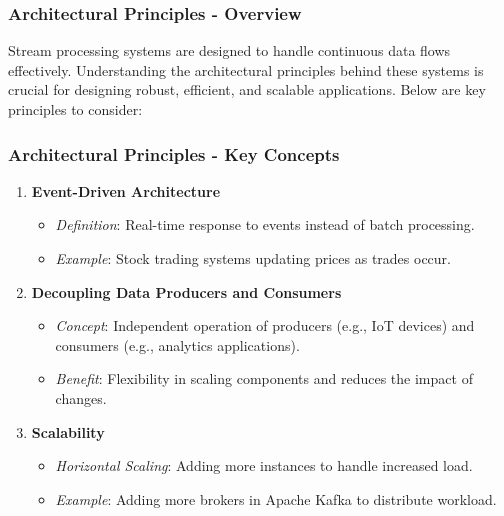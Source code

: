\documentclass[aspectratio=169]{beamer}
\begin{document}
\begin{frame}[fragile]
    \frametitle{Architectural Principles - Overview}
    Stream processing systems are designed to handle continuous data flows effectively. Understanding the architectural principles behind these systems is crucial for designing robust, efficient, and scalable applications. Below are key principles to consider:
\end{frame}

\begin{frame}[fragile]
    \frametitle{Architectural Principles - Key Concepts}
    \begin{enumerate}
        \item \textbf{Event-Driven Architecture}
        \begin{itemize}
            \item \textit{Definition}: Real-time response to events instead of batch processing.
            \item \textit{Example}: Stock trading systems updating prices as trades occur.
        \end{itemize}
        
        \item \textbf{Decoupling Data Producers and Consumers}
        \begin{itemize}
            \item \textit{Concept}: Independent operation of producers (e.g., IoT devices) and consumers (e.g., analytics applications).
            \item \textit{Benefit}: Flexibility in scaling components and reduces the impact of changes.
        \end{itemize}
        
        \item \textbf{Scalability}
        \begin{itemize}
            \item \textit{Horizontal Scaling}: Adding more instances to handle increased load.
            \item \textit{Example}: Adding more brokers in Apache Kafka to distribute workload.
        \end{itemize}
    \end{enumerate}
\end{frame}
\end{document}
